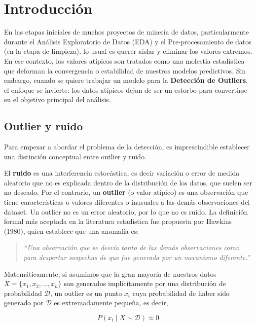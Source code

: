 \section{Introducción}

En las etapas iniciales de muchos proyectos de minería de datos, particularmente durante el Análisis Exploratorio de Datos (EDA) y el Pre-procesamiento de datos (en la etapa de limpieza), lo usual es querer aislar y eliminar los valores extremos. En ese contexto, los valores atípicos son tratados como una molestia estadística que deforman la convergencia o estabilidad de nuestros modelos predictivos. Sin embargo, cuando se quiere trabajar un modelo para la \textbf{Detección de Outliers}, el enfoque se invierte: los datos atípicos dejan de ser un estorbo para convertirse en el objetivo principal del análisis.

\subsection{Outlier y ruido}

Para empezar a abordar el problema de la detección, es imprescindible establecer una distinción conceptual entre outlier y ruido.

El \textbf{ruido} es una interferencia estocástica, es decir variación o error de medida aleatorio que no es explicada dentro de la distribución de los datos, que suelen ser no deseado. Por el contrario, un \textbf{outlier} (o valor atípico) es una observación que tiene características o valores diferentes o inusuales a las demás observaciones del dataset. Un outlier no es un error aleatorio, por lo que no es ruido. La definición formal más aceptada en la literatura estadística fue propuesta por Hawkins (1980), quien establece que una anomalía es:

\begin{quote}
	\textit{``Una observación que se desvía tanto de las demás observaciones como para despertar sospechas de que fue generada por un mecanismo diferente.''}
\end{quote}

Matemáticamente, si asumimos que la gran mayoría de nuestros datos $X = \{x_1, x_2, \dots, x_n\}$ son generados implícitamente por una distribución de probabilidad $\mathcal{D}$, un outlier es un punto $x_i$ cuya probabilidad de haber sido generado por $\mathcal{D}$ es extremadamente pequeña, es decir,

\[
P(x_i \mid X \sim \mathcal{D}) \approx 0
\]


